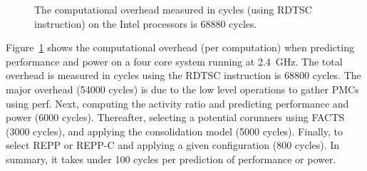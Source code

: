 \begin{figure}[t]
    \centering
{}
    \caption[Scalability of REPP and REPP-C]{ The computational overhead measured in cycles (using \textsf{RDTSC}
     instruction) on the Intel processors is 68880 cycles.} 
    \label{fig: scalability} %
\end{figure}


 Figure~\ref{fig: scalability} shows the computational overhead (per
computation) when predicting performance and power on a four core system running at
\SI{2.4}{\giga\hertz}.  The total overhead is measured in cycles using the \textsf{RDTSC}
instruction is 68800 cycles.  The major overhead (54000 cycles) is due to the low level
operations to gather PMCs using \textsf{perf}. Next, computing the activity ratio and
predicting performance and power (6000 cycles).  Thereafter, selecting a potential
corunners using FACTS (3000 cycles), and applying the consolidation model (5000 cycles).
Finally, to select REPP or REPP-C and applying a given configuration (800 cycles). In
summary, it takes under 100 cycles per prediction of performance or power.

